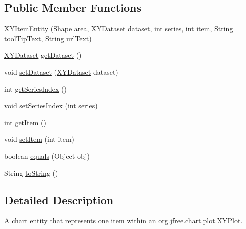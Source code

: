 \subsection*{Public Member Functions}
\begin{DoxyCompactItemize}
\item 
\mbox{\hyperlink{classorg_1_1jfree_1_1chart_1_1entity_1_1_x_y_item_entity_a90b0f5a876b4f1a9cd64d3bb95fccc35}{X\+Y\+Item\+Entity}} (Shape area, \mbox{\hyperlink{interfaceorg_1_1jfree_1_1data_1_1xy_1_1_x_y_dataset}{X\+Y\+Dataset}} dataset, int series, int item, String tool\+Tip\+Text, String url\+Text)
\item 
\mbox{\hyperlink{interfaceorg_1_1jfree_1_1data_1_1xy_1_1_x_y_dataset}{X\+Y\+Dataset}} \mbox{\hyperlink{classorg_1_1jfree_1_1chart_1_1entity_1_1_x_y_item_entity_a529e20b9fca4d7cf7f7ebf1794a4337f}{get\+Dataset}} ()
\item 
void \mbox{\hyperlink{classorg_1_1jfree_1_1chart_1_1entity_1_1_x_y_item_entity_a7abc7c46eb0a3b0aff9a119c06be45b0}{set\+Dataset}} (\mbox{\hyperlink{interfaceorg_1_1jfree_1_1data_1_1xy_1_1_x_y_dataset}{X\+Y\+Dataset}} dataset)
\item 
int \mbox{\hyperlink{classorg_1_1jfree_1_1chart_1_1entity_1_1_x_y_item_entity_abe78c2f104387a3b64a42799638e1e54}{get\+Series\+Index}} ()
\item 
void \mbox{\hyperlink{classorg_1_1jfree_1_1chart_1_1entity_1_1_x_y_item_entity_ab7b8734cff639c25f6d3da2e589bb828}{set\+Series\+Index}} (int series)
\item 
int \mbox{\hyperlink{classorg_1_1jfree_1_1chart_1_1entity_1_1_x_y_item_entity_a596da177bae684d73fe499fee8ce34fa}{get\+Item}} ()
\item 
void \mbox{\hyperlink{classorg_1_1jfree_1_1chart_1_1entity_1_1_x_y_item_entity_acafc408092dc6865d99b47a7f8ae59e9}{set\+Item}} (int item)
\item 
boolean \mbox{\hyperlink{classorg_1_1jfree_1_1chart_1_1entity_1_1_x_y_item_entity_a51a3b181502beeeb6b136160ee1f6e12}{equals}} (Object obj)
\item 
String \mbox{\hyperlink{classorg_1_1jfree_1_1chart_1_1entity_1_1_x_y_item_entity_ad0138b974e5906df4416a883c288357b}{to\+String}} ()
\end{DoxyCompactItemize}


\subsection{Detailed Description}
A chart entity that represents one item within an \mbox{\hyperlink{classorg_1_1jfree_1_1chart_1_1plot_1_1_x_y_plot}{org.\+jfree.\+chart.\+plot.\+X\+Y\+Plot}}. 


